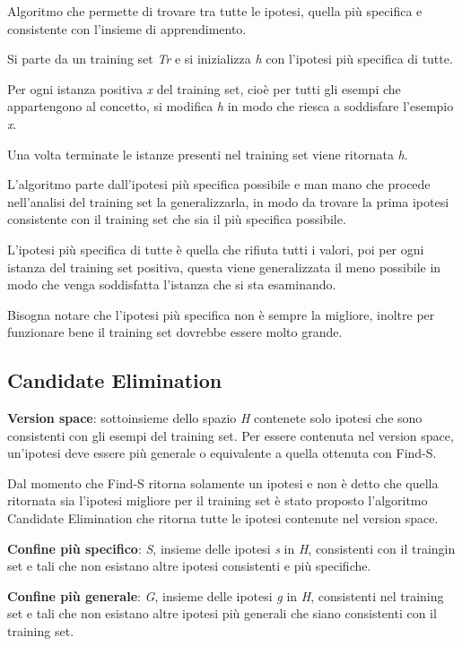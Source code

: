 Algoritmo che permette di trovare tra tutte le ipotesi, quella più
specifica e consistente con l'insieme di apprendimento.

Si parte da un training set \emph{Tr} e si inizializza \emph{h} con
l'ipotesi più specifica di tutte.

Per ogni istanza positiva \emph{x} del training set, cioè per tutti gli
esempi che appartengono al concetto, si modifica \emph{h} in modo che
riesca a soddisfare l'esempio \emph{x}.

Una volta terminate le istanze presenti nel training set viene ritornata
\emph{h}.

L'algoritmo parte dall'ipotesi più specifica possibile e man mano che
procede nell'analisi del training set la generalizzarla, in modo da
trovare la prima ipotesi consistente con il training set che sia il più
specifica possibile.

L'ipotesi più specifica di tutte è quella che rifiuta tutti i valori,
poi per ogni istanza del training set positiva, questa viene
generalizzata il meno possibile in modo che venga soddisfatta l'istanza
che si sta esaminando.

Bisogna notare che l'ipotesi più specifica non è sempre la migliore,
inoltre per funzionare bene il training set dovrebbe essere molto
grande.

\subsection{Candidate Elimination}\label{candidate-elimination}

\textbf{Version space}: sottoinsieme dello spazio \emph{H} contenete
solo ipotesi che sono consistenti con gli esempi del training set. Per
essere contenuta nel version space, un'ipotesi deve essere più generale
o equivalente a quella ottenuta con Find-S.

Dal momento che Find-S ritorna solamente un ipotesi e non è detto che
quella ritornata sia l'ipotesi migliore per il training set è stato
proposto l'algoritmo Candidate Elimination che ritorna tutte le ipotesi
contenute nel version space.

\textbf{Confine più specifico}: \emph{S}, insieme delle ipotesi \emph{s}
in \emph{H}, consistenti con il traingin set e tali che non esistano
altre ipotesi consistenti e più specifiche.

\textbf{Confine più generale}: \emph{G}, insieme delle ipotesi \emph{g}
in \emph{H}, consistenti nel training set e tali che non esistano altre
ipotesi più generali che siano consistenti con il training set.

